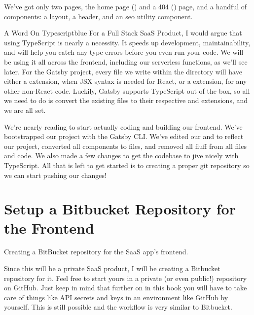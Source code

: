 \documentclass[a4paper,headinclude=on,footinclude=on,12pt,oneside]{scrbook}
\begin{document}
We've got only two pages, the home page () and a 404 () page, and a handful of components: a layout, a header, and an seo utility component.

\begin{highlightBox}{A Word On Typescript}{blue}{\information}
For a Full Stack SaaS Product, I would argue that using TypeScript is nearly a necessity. It speeds up development, maintainability, and will help you catch any type errors before you even run your code. We will be using it all across the frontend, including our serverless functions, as we'll see later.
\newline
\newline
For the Gatsby project, every file we write within the  directory will have either a  extension, when JSX syntax is needed for React, or a  extension, for any other non-React code. Luckily, Gatsby supports TypeScript out of the box, so all we need to do is convert the existing files to their respective  and  extensions, and we are all set.
\end{highlightBox}


We're nearly reading to start actually coding and building our frontend. We've bootstrapped our project with the Gatsby CLI. We've edited our  and  to reflect our project, converted all components to  files, and removed all fluff from all files and code. We also made a few changes to get the codebase to jive nicely with TypeScript. All that is left to get started is to creating a proper git repository so we can start pushing our changes!

\section{Setup a Bitbucket Repository for the Frontend}
\begin{arrows}
\item Creating a BitBucket repository for the SaaS app's frontend.
\end{arrows}

Since this will be a private SaaS product, I will be creating a Bitbucket repository for it. Feel free to start yours in a private (or even public!) repository on GitHub. Just keep in mind that further on in this book you will have to take care of things like API secrets and keys in an environment like GitHub by yourself. This is still possible and the workflow is very similar to Bitbucket.
\end{document}
